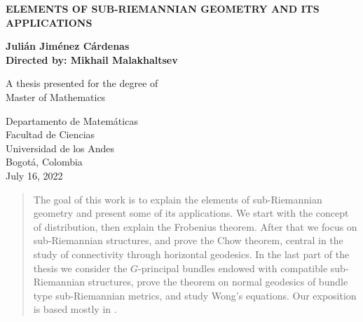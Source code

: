 \documentclass[12pt, letterpaper, reqno]{amsart}
\author{}
\title{}
\let\oldtableofcontents\tableofcontents
\renewcommand{\tableofcontents}{%
  \vspace*{-\linespacing}%
  \oldtableofcontents}
\theoremstyle{definition}
\theoremstyle{plain}
\theoremstyle{remark}
\begin{document}
\begin{titlepage}
    \begin{center}
        \vspace*{1cm}
            
        \Huge
	\textbf{ELEMENTS OF SUB-RIEMANNIAN GEOMETRY AND ITS APPLICATIONS}
        \vspace{0.5cm}
        \LARGE
            
        \vspace{1.5cm}
            
        \textbf{Julián Jiménez Cárdenas}\\
        \textbf{Directed by: Mikhail Malakhaltsev}
            
        \vfill
            
        A thesis presented for the degree of\\
        Master of Mathematics
            
        \vspace{0.8cm}
            
            
        \Large
        Departamento de Matemáticas\\
        Facultad de Ciencias \\
        Universidad de los Andes\\
        Bogotá, Colombia\\
        July 16, 2022
            
    \end{center}
\end{titlepage}
\maketitle
\newpage
\tableofcontents
\newpage
\begin{abstract}
		The goal of this work is to explain the elements of sub-Riemannian geometry and present some of its applications. We start with the concept of distribution, then explain the Frobenius theorem. After that we focus on sub-Riemannian structures, and prove the Chow theorem, central in the study of connectivity through horizontal geodesics. In the last part of the thesis we consider the $ G $-principal bundles endowed with compatible sub-Riemannian structures, prove the theorem on normal geodesics of bundle type sub-Riemannian metrics, and study Wong's equations. Our exposition is based mostly in \cite{montgomery2002tour}.
\end{abstract}
\newpage
{}
\end{document}
